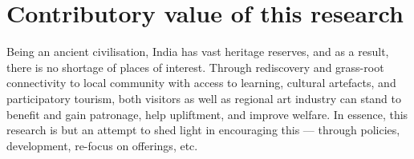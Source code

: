 \section{Contributory value of this research} %
\label{sec:cvalue}

Being an ancient civilisation, India has vast heritage reserves, and as a result, there is no shortage of places of interest. Through rediscovery and grass-root connectivity to local community with access to learning, cultural artefacts, and participatory tourism, both visitors as well as regional art industry can stand to benefit and gain patronage, help upliftment, and improve welfare. In essence, this research is but an attempt to shed light in encouraging this --- through policies, development, re-focus on offerings, etc.


